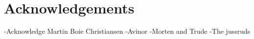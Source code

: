 \chapter*{Acknowledgements}
-Acknowledge Martin Boie Christiansen
-Avinor
-Morten and Trude
-The jussruds
\cleardoublepage